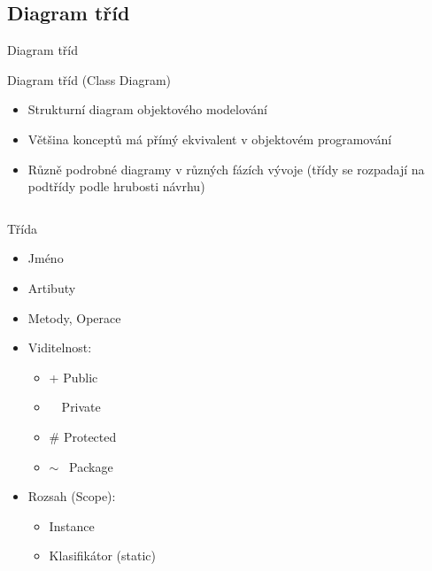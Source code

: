 \subsection{Diagram tříd}




\begin{frame}{Diagram tříd}

Diagram tříd (Class Diagram)
\begin{itemize}[<+->]
    \item<+->Strukturní diagram objektového modelování
    \item<+->Většina konceptů má přímý ekvivalent v objektovém programování
    \item<+->Různě podrobné diagramy v různých fázích vývoje 
             (třídy se rozpadají na podtřídy podle hrubosti návrhu)
\end{itemize}

\begin{columns}[T]

    \begin{column}{0.45\textwidth}
        Třída  
        \begin{itemize}[<+->]
            \item<+->Jméno
            \item<+->Artibuty
            \item<+->Metody, Operace
            \item<+->Viditelnost:
            \begin{itemize}
                \item + Public
                \item \textendash ~~Private
                \item \# Protected
                \item $\sim$ ~Package
            \end{itemize}
            
            \item<+->Rozsah (Scope):
            \begin{itemize}
                \item Instance
                \item Klasifikátor (static)
            \end{itemize}
        \end{itemize}
    \end{column}

    \begin{column}{0.55\textwidth}
		\onslide<4->
		\begin{figure}
		\end{figure}
    \end{column}

\end{columns}
\end{frame}

